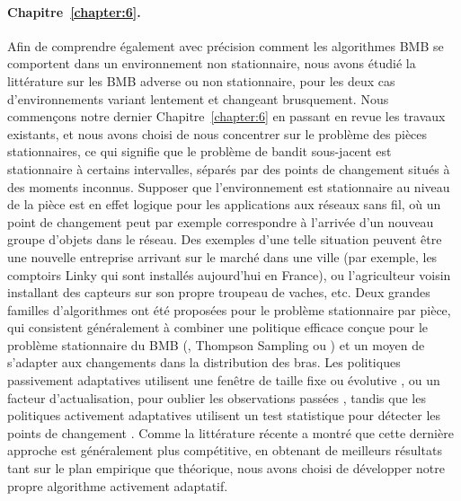 \begin{resume_fr}
\paragraph{Chapitre~\ref{chapter:6}.}
%
Afin de comprendre également avec précision comment les algorithmes BMB se comportent dans un environnement non stationnaire, nous avons étudié la littérature sur les BMB adverse ou non stationnaire, pour les deux cas d'environnements variant lentement et changeant brusquement.
Nous commençons notre dernier Chapitre~\ref{chapter:6} en passant en revue les travaux existants,
et nous avons choisi de nous concentrer sur le problème des pièces stationnaires,
ce qui signifie que le problème de bandit sous-jacent est stationnaire à certains intervalles, séparés par des points de changement situés à des moments inconnus.
Supposer que l'environnement est stationnaire au niveau de la pièce est en effet logique pour les applications aux réseaux sans fil, où un point de changement peut par exemple correspondre à l'arrivée d'un nouveau groupe d'objets dans le réseau. Des exemples d'une telle situation peuvent être une nouvelle entreprise arrivant sur le marché dans une ville (par exemple, les comptoirs Linky qui sont installés aujourd'hui en France), ou l'agriculteur voisin installant des capteurs sur son propre troupeau de vaches, etc.
%
Deux grandes familles d'algorithmes ont été proposées pour le problème stationnaire par pièce,
qui consistent généralement à combiner une politique efficace conçue pour le problème stationnaire du BMB (\eg, Thompson Sampling ou \klUCB) et un moyen de s'adapter aux changements dans la distribution des bras.
Les politiques passivement adaptatives utilisent une fenêtre de taille fixe ou évolutive \cite{Garivier11UCBDiscount}, ou un facteur d'actualisation, pour oublier les observations passées \cite{Kocsis06,Gupta11thompson},
tandis que les politiques activement adaptatives utilisent un test statistique pour détecter les points de changement \cite{MellorShapiro13,Allesiardo15}.
%
Comme la littérature récente a montré que cette dernière approche est généralement plus compétitive, en obtenant de meilleurs résultats tant sur le plan empirique que théorique, nous avons choisi de développer notre propre algorithme activement adaptatif.


\end{resume_fr}
